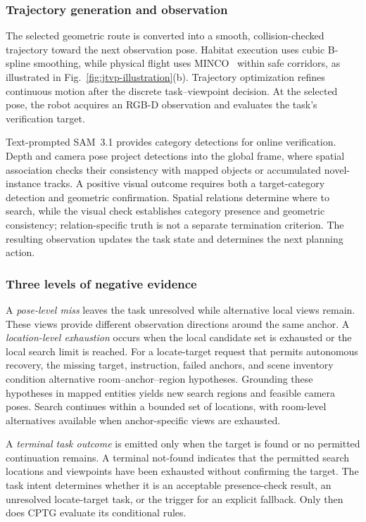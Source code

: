 \documentclass[letterpaper,10pt,journal]{IEEEtran}
\begin{document}
\subsubsection{Trajectory generation and observation}
The selected geometric route is converted into a smooth, collision-checked trajectory toward the next observation pose. Habitat execution uses cubic B-spline smoothing, while physical flight uses MINCO~\cite{wang2022minco} within safe corridors, as illustrated in Fig.~\ref{fig:jtvp-illustration}(b). Trajectory optimization refines continuous motion after the discrete task--viewpoint decision. At the selected pose, the robot acquires an RGB-D observation and evaluates the task's verification target.

Text-prompted SAM~3.1 provides category detections for online verification. Depth and camera pose project detections into the global frame, where spatial association checks their consistency with mapped objects or accumulated novel-instance tracks. A positive visual outcome requires both a target-category detection and geometric confirmation. Spatial relations determine where to search, while the visual check establishes category presence and geometric consistency; relation-specific truth is not a separate termination criterion. The resulting observation updates the task state and determines the next planning action.

\subsubsection{Three levels of negative evidence}
A \emph{pose-level miss} leaves the task unresolved while alternative local views remain. These views provide different observation directions around the same anchor. A \emph{location-level exhaustion} occurs when the local candidate set is exhausted or the local search limit is reached. For a locate-target request that permits autonomous recovery, the missing target, instruction, failed anchors, and scene inventory condition alternative room--anchor--region hypotheses. Grounding these hypotheses in mapped entities yields new search regions and feasible camera poses. Search continues within a bounded set of locations, with room-level alternatives available when anchor-specific views are exhausted.

A \emph{terminal task outcome} is emitted only when the target is found or no permitted continuation remains. A terminal not-found indicates that the permitted search locations and viewpoints have been exhausted without confirming the target. The task intent determines whether it is an acceptable presence-check result, an unresolved locate-target task, or the trigger for an explicit fallback. Only then does CPTG evaluate its conditional rules.
\end{document}

